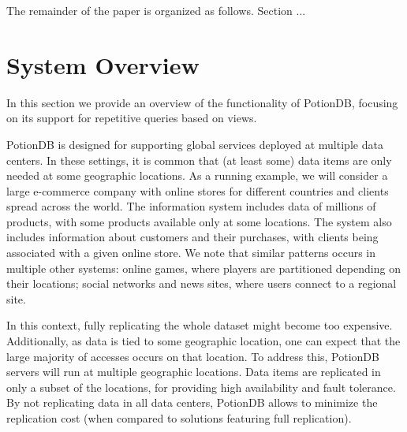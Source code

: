 \documentclass{vldb}
\newcommand{\outline}[1]{}
\begin{document}
The remainder of the paper is organized as follows. Section ...

\outline{topicos

\begin{itemize}
	\item Num. DC a aumentar
	\item Replicar totalmente tem problemas
	\item Replicação parcial
	\item Queries sobre dados replicados parcialmente
	\begin{itemize}
		\item Standard solution?
	\end{itemize}
	\item Views materializadas replicadas totalmente
	\item Contribuições
\end{itemize}
}

\section{System Overview}
\label{sec:overview}

In this section we provide an overview of the functionality of PotionDB, focusing on its support for 
repetitive queries based on views.

PotionDB is designed for supporting global services deployed at multiple data centers. In these settings,
it is common that (at least some) data items are only needed at some geographic locations. 
As a running example, we will consider a large e-commerce company with online stores for different countries 
and clients spread across the world. 
The information system includes data of millions of products, with some products available only at some locations.
The system also includes information about customers and their purchases, with clients being associated with a given 
online store. 
We note that similar patterns occurs in multiple other systems: online games, where players are partitioned depending
on their locations; social networks and news sites, where users connect to a regional site.

In this context, fully replicating the whole dataset might become too expensive.
Additionally, as data is tied to some geographic location, one can expect that the large majority of accesses
occurs on that location. 
To address this, PotionDB servers will run at multiple geographic locations.
Data items are replicated in only a subset of the locations, for providing high availability and fault tolerance.
By not replicating data in all data centers, PotionDB allows to minimize the replication cost (when
compared to solutions featuring full replication).
\end{document}
